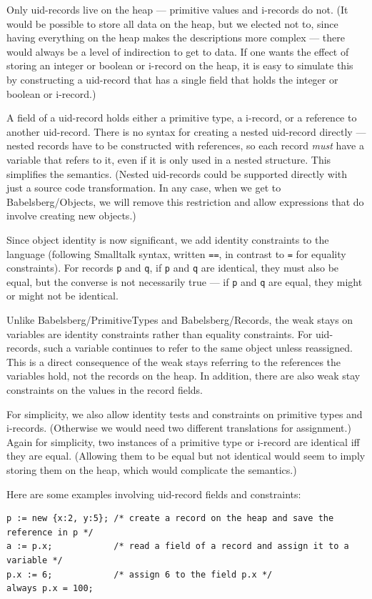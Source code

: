\documentclass{article}
\begin{document}
Only uid-records live on the heap --- primitive values and i-records do
not.  (It would be possible to store all data on the heap, but we
elected not to, since having everything on the heap makes the
descriptions more complex --- there would always be a level of
indirection to get to data.  If one wants the effect of storing an
integer or boolean or i-record on the heap, it is easy to simulate
this by constructing a uid-record that has a single field that holds
the integer or boolean or i-record.)

A field of a uid-record holds either a primitive type, a i-record,
or a reference to another uid-record.  There is no syntax for creating
a nested uid-record directly --- nested records have to be constructed
with references, so each record \emph{must} have a variable that
refers to it, even if it is only used in a nested structure. This
simplifies the semantics.  (Nested uid-records could be supported
directly with just a source code transformation.  In any case, when we
get to Babelsberg/Objects, we will remove this restriction and allow
expressions that do involve creating new objects.)

Since object identity is now significant, we add identity constraints
to the language (following Smalltalk syntax, 
written \verb|==|, in contrast to \verb|=| for
equality constraints).  For records \verb|p| and \verb|q|, if \verb|p|
and \verb|q| are identical, they must also be equal, but the converse
is not necessarily true --- if \verb|p| and \verb|q| are equal, they
might or might not be identical.

Unlike Babelsberg/PrimitiveTypes and Babelsberg/Records, the weak
stays on variables are identity constraints rather than equality
constraints.  For uid-records, such a variable continues to refer to
the same object unless reassigned.  This is a direct consequence of
the weak stays referring to the references the variables hold, not the
records on the heap.  In addition, there are also weak stay
constraints on the values in the record fields.

For simplicity, we also allow identity tests and constraints on
primitive types and i-records.  (Otherwise we would need two different
translations for assignment.)  Again for simplicity, two instances of
a primitive type or i-record are identical iff they are equal.
(Allowing them to be equal but not identical would seem to imply
storing them on the heap, which would complicate the semantics.)

Here are some examples involving uid-record fields and constraints:
\begin{verbatim}
p := new {x:2, y:5}; /* create a record on the heap and save the reference in p */
a := p.x;            /* read a field of a record and assign it to a variable */
p.x := 6;            /* assign 6 to the field p.x */
always p.x = 100;
\end{verbatim}
\end{document}
